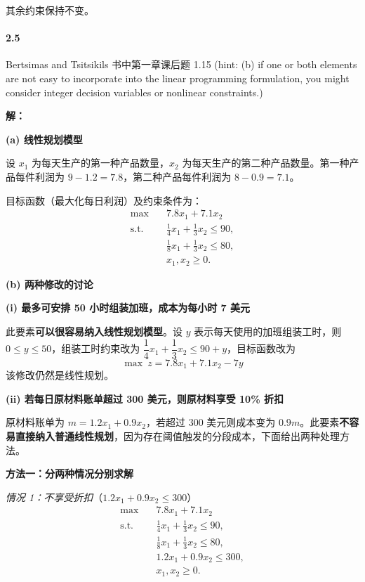 \documentclass[12pt,a4paper]{article}
\begin{document}
其余约束保持不变。

\paragraph{2.5}
Bertsimas and Tsitsikils 书中第一章课后题 1.15
(hint: (b) if one or both elements are not easy to incorporate into the linear programming formulation, you might consider integer decision variables or nonlinear constraints.)

\textbf{解：}

\textbf{(a) 线性规划模型}

设 $x_1$ 为每天生产的第一种产品数量，$x_2$ 为每天生产的第二种产品数量。第一种产品每件利润为 $9-1.2=7.8$，第二种产品每件利润为 $8-0.9=7.1$。

目标函数（最大化每日利润）及约束条件为：
\[
\begin{aligned}
\max\quad & 7.8x_1+7.1x_2\\
\text{s.t.}\quad
& \frac{1}{4}x_1+\frac{1}{3}x_2\le 90,\\
& \frac{1}{8}x_1+\frac{1}{3}x_2\le 80,\\
& x_1,x_2\ge 0.
\end{aligned}
\]

\textbf{(b) 两种修改的讨论}

\textbf{(i) 最多可安排 50 小时组装加班，成本为每小时 7 美元}

此要素\textbf{可以很容易纳入线性规划模型}。设 $y$ 表示每天使用的加班组装工时，则 $0\le y\le 50$，组装工时约束改为 $\dfrac{1}{4}x_1+\dfrac{1}{3}x_2\le 90+y$，目标函数改为
\[
\max\ z=7.8x_1+7.1x_2-7y
\]
该修改仍然是线性规划。

\textbf{(ii) 若每日原材料账单超过 300 美元，则原材料享受 10\% 折扣}

原材料账单为 $m=1.2x_1+0.9x_2$，若超过 300 美元则成本变为 $0.9m$。此要素\textbf{不容易直接纳入普通线性规划}，因为存在阈值触发的分段成本，下面给出两种处理方法。

\textbf{方法一：分两种情况分别求解}

\textit{情况 1：不享受折扣}（$1.2x_1+0.9x_2\le 300$）
\[
\begin{aligned}
\max\quad & 7.8x_1+7.1x_2\\
\text{s.t.}\quad
& \frac{1}{4}x_1+\frac{1}{3}x_2\le 90,\\
& \frac{1}{8}x_1+\frac{1}{3}x_2\le 80,\\
& 1.2x_1+0.9x_2\le 300,\\
& x_1,x_2\ge 0.
\end{aligned}
\]
\end{document}
